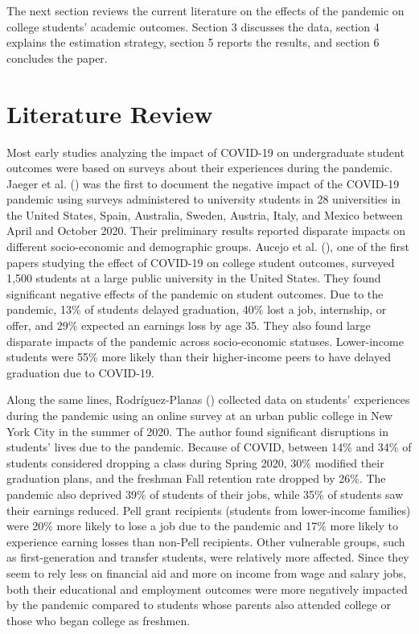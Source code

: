\documentclass[
  12pt,
  letterpaper,
  DIV=11,
  numbers=noendperiod]{scrartcl}
\begin{document}
The next section reviews the current literature on the effects of the
pandemic on college students' academic outcomes. Section 3 discusses the
data, section 4 explains the estimation strategy, section 5 reports the
results, and section 6 concludes the paper.

\section{Literature Review}\label{literature-review}

Most early studies analyzing the impact of COVID-19 on undergraduate
student outcomes were based on surveys about their experiences during
the pandemic. Jaeger et al. ()
was the first to document the negative impact of the COVID-19 pandemic
using surveys administered to university students in 28 universities in
the United States, Spain, Australia, Sweden, Austria, Italy, and Mexico
between April and October 2020. Their preliminary results reported
disparate impacts on different socio-economic and demographic groups.
Aucejo et al. (), one of the
first papers studying the effect of COVID-19 on college student
outcomes, surveyed 1,500 students at a large public university in the
United States. They found significant negative effects of the pandemic
on student outcomes. Due to the pandemic, 13\% of students delayed
graduation, 40\% lost a job, internship, or offer, and 29\% expected an
earnings loss by age 35. They also found large disparate impacts of the
pandemic across socio-economic statuses. Lower-income students were 55\%
more likely than their higher-income peers to have delayed graduation
due to COVID-19.

Along the same lines, Rodríguez-Planas
() collected data on
students' experiences during the pandemic using an online survey at an
urban public college in New York City in the summer of 2020. The author
found significant disruptions in students' lives due to the pandemic.
Because of COVID, between 14\% and 34\% of students considered dropping
a class during Spring 2020, 30\% modified their graduation plans, and
the freshman Fall retention rate dropped by 26\%. The pandemic also
deprived 39\% of students of their jobs, while 35\% of students saw
their earnings reduced. Pell grant recipients (students from
lower-income families) were 20\% more likely to lose a job due to the
pandemic and 17\% more likely to experience earning losses than non-Pell
recipients. Other vulnerable groups, such as first-generation and
transfer students, were relatively more affected. Since they seem to
rely less on financial aid and more on income from wage and salary jobs,
both their educational and employment outcomes were more negatively
impacted by the pandemic compared to students whose parents also
attended college or those who began college as freshmen.
\end{document}
